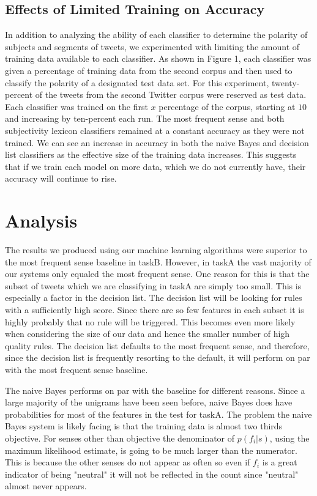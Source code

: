 \documentclass[11pt]{article}
\begin{document}
\subsection{Effects of Limited Training on Accuracy}
In addition to analyzing the ability of each classifier to determine the polarity of subjects and segments of tweets, we experimented with limiting the amount of training data available to each classifier. As shown in Figure 1, each classifier was given a percentage of training data from the second corpus and then used to classify the polarity of a designated test data set. For this experiment, twenty-percent of the tweets from the second Twitter corpus were reserved as test data. Each classifier was trained on the first $x$ percentage of the corpus, starting at $10$ and increasing by ten-percent each run. The most frequent sense and both subjectivity lexicon classifiers remained at a constant accuracy as they were not trained. We can see an increase in accuracy in both the naive Bayes and decision list classifiers as the effective size of the training data increases. This suggests that if we train each model on more data, which we do not currently have, their accuracy will continue to rise. 

\section{Analysis}
\indent The results we produced using our machine learning algorithms were superior to the most frequent sense baseline in taskB. However, in taskA the vast majority of our systems only equaled the most frequent sense. One reason for this is that the subset of tweets which we are classifying in taskA are simply too small. This is especially a factor in the decision list. The decision list will be looking for rules with a sufficiently high score. Since there are so few features in each subset it is highly probably that no rule will be triggered. This becomes even more likely when considering the size of our data and hence the smaller number of high quality rules. The decision list defaults to the most frequent sense, and therefore, since the decision list is frequently resorting to the default, it will perform on par with the most frequent sense baseline.

The naive Bayes performs on par with the baseline for different reasons. Since a large majority of the unigrams have been seen before, naive Bayes does have probabilities for most of the features in the test for taskA. The problem the naive Bayes system is likely facing is that the training data is almost two thirds objective. For senses other than objective the denominator of $p(f_i |  s)$, using the maximum likelihood estimate, is going to be much larger than the numerator. This is because the other senses do not appear as often so even if $f_i$ is a great indicator of being "neutral" it will not be reflected in the count since "neutral" almost never appears.
\end{document}
